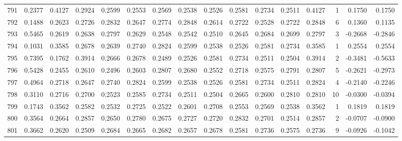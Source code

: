 \begin{tabular}{lrrrrrrrrrrrrrrr}
791 &      0.2377 &  0.4127 &  0.2924 &  0.2599 &  0.2553 &  0.2569 &  0.2538 &  0.2526 &  0.2581 &  0.2734 &   0.2511 &     0.4127 &      1 &                    0.1750 &                     0.1750 \\
792 &      0.1488 &  0.2623 &  0.2726 &  0.2832 &  0.2647 &  0.2774 &  0.2848 &  0.2614 &  0.2722 &  0.2528 &   0.2722 &     0.2848 &      6 &                    0.1360 &                     0.1135 \\
793 &      0.5465 &  0.2619 &  0.2638 &  0.2797 &  0.2629 &  0.2548 &  0.2542 &  0.2510 &  0.2645 &  0.2684 &   0.2699 &     0.2797 &      3 &                   -0.2668 &                    -0.2846 \\
794 &      0.1031 &  0.3585 &  0.2678 &  0.2639 &  0.2740 &  0.2824 &  0.2599 &  0.2538 &  0.2526 &  0.2581 &   0.2734 &     0.3585 &      1 &                    0.2554 &                     0.2554 \\
795 &      0.7395 &  0.1762 &  0.3914 &  0.2666 &  0.2678 &  0.2489 &  0.2526 &  0.2581 &  0.2734 &  0.2511 &   0.2504 &     0.3914 &      2 &                   -0.3481 &                    -0.5633 \\
796 &      0.5428 &  0.2455 &  0.2610 &  0.2496 &  0.2603 &  0.2807 &  0.2680 &  0.2552 &  0.2718 &  0.2575 &   0.2791 &     0.2807 &      5 &                   -0.2621 &                    -0.2973 \\
797 &      0.4964 &  0.2718 &  0.2647 &  0.2740 &  0.2824 &  0.2599 &  0.2538 &  0.2526 &  0.2581 &  0.2734 &   0.2511 &     0.2824 &      4 &                   -0.2140 &                    -0.2246 \\
798 &      0.3110 &  0.2716 &  0.2700 &  0.2523 &  0.2585 &  0.2734 &  0.2511 &  0.2504 &  0.2665 &  0.2600 &   0.2810 &     0.2810 &     10 &                   -0.0300 &                    -0.0394 \\
799 &      0.1743 &  0.3562 &  0.2582 &  0.2532 &  0.2725 &  0.2522 &  0.2601 &  0.2708 &  0.2553 &  0.2569 &   0.2538 &     0.3562 &      1 &                    0.1819 &                     0.1819 \\
800 &      0.3564 &  0.2664 &  0.2857 &  0.2650 &  0.2780 &  0.2675 &  0.2727 &  0.2720 &  0.2832 &  0.2701 &   0.2514 &     0.2857 &      2 &                   -0.0707 &                    -0.0900 \\
801 &      0.3662 &  0.2620 &  0.2509 &  0.2684 &  0.2665 &  0.2682 &  0.2657 &  0.2678 &  0.2581 &  0.2736 &   0.2575 &     0.2736 &      9 &                   -0.0926 &                    -0.1042 \\

\end{tabular}
